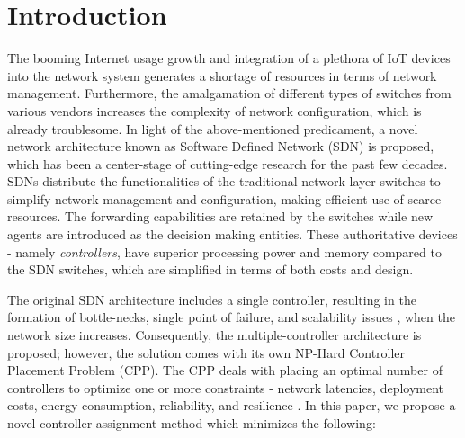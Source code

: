 \documentclass[final,5p,times]{cas-dc}
\begin{document}
	\section{Introduction}
	The booming Internet usage growth and integration of a plethora of IoT devices into the network system generates a shortage of resources in terms of network management. Furthermore, the amalgamation of different types of switches from various vendors increases the complexity of network configuration, which is already troublesome. In light of the above-mentioned predicament, a novel network architecture known as Software Defined Network (SDN) is proposed, which has been a center-stage of cutting-edge research for the past few decades. SDNs distribute the functionalities of the traditional network layer switches to simplify network management and configuration, making efficient use of scarce resources. The forwarding capabilities are retained by the switches while new agents are introduced as the decision making entities. These authoritative devices - namely \textit{controllers}, have superior processing power and memory compared to the SDN switches, which are simplified in terms of both costs and design.
	
	The original SDN architecture \cite{greene2009tr10} includes a single controller, resulting in the formation of bottle-necks, single point of failure, and scalability issues \cite{scalability2013dixit, scalability2013yeganeh}, when the network size increases. Consequently, the multiple-controller architecture is proposed; however, the solution comes with its own NP-Hard Controller Placement Problem (CPP). The CPP deals with placing an optimal number of controllers to optimize one or more constraints - network latencies, deployment costs, energy consumption, reliability, and resilience \cite{zhang2017survey, singh2018survey, cox2017survey}. In this paper, we propose a novel controller assignment method which minimizes the following:
	
\end{document}
